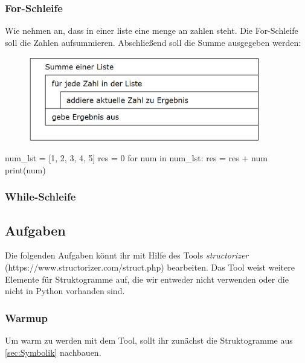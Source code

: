 \subsubsection{For-Schleife}
Wie nehmen an, dass in einer liste eine menge an zahlen steht. Die For-Schleife soll die Zahlen aufsummieren. Abschließend soll die Summe ausgegeben werden:

\begin{minipage}{.45\textwidth}
	\centering
	\begin{figure}[H]
		\begin{center}
			\includegraphics[width=0.9\textwidth]{imgs/for_loop.png} %
		\end{center}
	\end{figure}
\end{minipage}
\begin{minipage}{.45\textwidth}
\begin{python}
num_lst = [1, 2, 3, 4, 5]
res = 0
for num in num_lst:
	res = res + num
print(num)
\end{python}
\end{minipage}

\subsubsection{While-Schleife}


\subsection{Aufgaben}
Die folgenden Aufgaben könnt ihr mit Hilfe des Tools \textit{structorizer} (https://www.structorizer.com/struct.php) bearbeiten. Das Tool weist weitere Elemente für Struktogramme auf, die wir entweder nicht verwenden oder die nicht in Python vorhanden sind.

\subsubsection{Warmup}
Um warm zu werden mit dem Tool, sollt ihr zunächst die Struktogramme aus \ref{sec:Symbolik} nachbauen. 

